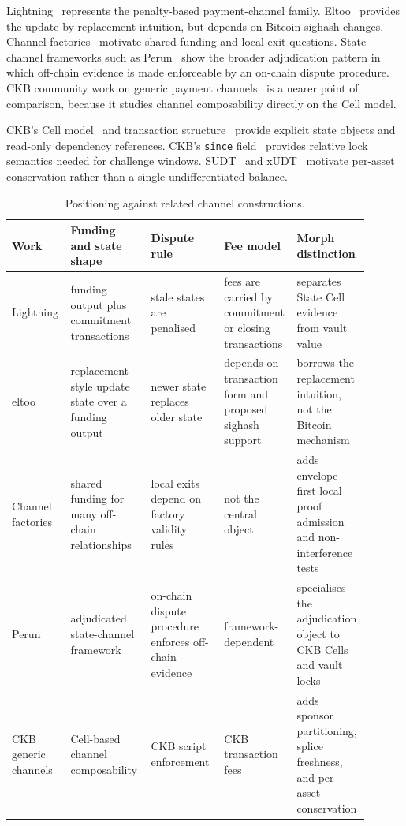 \documentclass[a4paper,11pt]{article}
\begin{document}
Lightning~\cite{lightning} represents the penalty-based payment-channel family. Eltoo~\cite{eltoo} provides the update-by-replacement intuition, but depends on Bitcoin sighash changes. Channel factories~\cite{factories} motivate shared funding and local exit questions. State-channel frameworks such as Perun~\cite{perun} show the broader adjudication pattern in which off-chain evidence is made enforceable by an on-chain dispute procedure. CKB community work on generic payment channels~\cite{ckb-gpc} is a nearer point of comparison, because it studies channel composability directly on the Cell model.

CKB's Cell model~\cite{ckb-cell} and transaction structure~\cite{ckb-tx} provide explicit state objects and read-only dependency references. CKB's \texttt{since} field~\cite{ckb-since,ckb-since-timestamp,ckb-since-epoch} provides relative lock semantics needed for challenge windows. SUDT~\cite{sudt} and xUDT~\cite{xudt} motivate per-asset conservation rather than a single undifferentiated balance.

\begin{table}[htbp]
\centering
\small
\setlength{\tabcolsep}{3pt}
\begin{tabular}{L{0.15\linewidth}L{0.22\linewidth}L{0.20\linewidth}L{0.15\linewidth}L{0.18\linewidth}}
\toprule
Work & Funding and state shape & Dispute rule & Fee model & Morph distinction \\
\midrule
Lightning & funding output plus commitment transactions & stale states are penalised & fees are carried by commitment or closing transactions & separates State Cell evidence from vault value \\
eltoo & replacement-style update state over a funding output & newer state replaces older state & depends on transaction form and proposed sighash support & borrows the replacement intuition, not the Bitcoin mechanism \\
Channel factories & shared funding for many off-chain relationships & local exits depend on factory validity rules & not the central object & adds envelope-first local proof admission and non-interference tests \\
Perun & adjudicated state-channel framework & on-chain dispute procedure enforces off-chain evidence & framework-dependent & specialises the adjudication object to CKB Cells and vault locks \\
CKB generic channels & Cell-based channel composability & CKB script enforcement & CKB transaction fees & adds sponsor partitioning, splice freshness, and per-asset conservation \\
\bottomrule
\end{tabular}
\caption{Positioning against related channel constructions.}
\label{tab:related-work}
\end{table}
\end{document}

